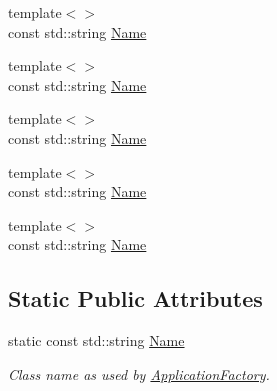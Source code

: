 \begin{DoxyCompactItemize}
\item 
{\footnotesize template$<$$>$ }\\const std\+::string \hyperlink{classUintah_1_1PhaseField_1_1PureMetal_a1e322e8581543b0ffb02af48bace6731}{Name}
\item 
{\footnotesize template$<$$>$ }\\const std\+::string \hyperlink{classUintah_1_1PhaseField_1_1PureMetal_ab5e48a2ac5013c3ac87f497418ab19c9}{Name}
\item 
{\footnotesize template$<$$>$ }\\const std\+::string \hyperlink{classUintah_1_1PhaseField_1_1PureMetal_a7bf6a9bfad4bded3c99b94ce721c71c0}{Name}
\item 
{\footnotesize template$<$$>$ }\\const std\+::string \hyperlink{classUintah_1_1PhaseField_1_1PureMetal_a6264dabd374ea7e11d9794861f359b62}{Name}
\item 
{\footnotesize template$<$$>$ }\\const std\+::string \hyperlink{classUintah_1_1PhaseField_1_1PureMetal_a4b87c88ceb27d8c139354a2867a39d9e}{Name}
\end{DoxyCompactItemize}
\subsection*{Static Public Attributes}
\begin{DoxyCompactItemize}
\item 
static const std\+::string \hyperlink{classUintah_1_1PhaseField_1_1PureMetal_a7405e739fb77d6fb2d082e1020096b01}{Name}
\begin{DoxyCompactList}\small\item\em Class name as used by \hyperlink{classUintah_1_1PhaseField_1_1ApplicationFactory}{Application\+Factory}. \end{DoxyCompactList}\end{DoxyCompactItemize}
